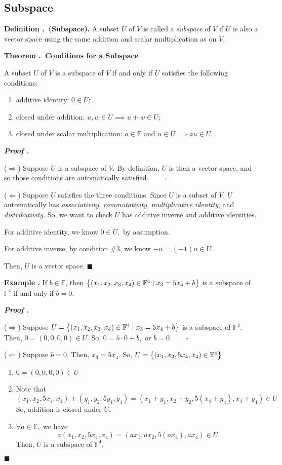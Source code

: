 \documentclass[11pt, letterpaper]{article}
\newcounter{index}[subsection]
\newenvironment*{df}[1]{\par\noindent\textbf{Definition \thesubsection.\stepcounter{index}\theindex\ (#1).}}{\par}
\newenvironment*{eg}{\begin{framed}\par\noindent\textbf{Example \thesubsection.\stepcounter{index}\theindex}}{\par\end{framed}}
\newenvironment*{thm}[1]{\begin{tcolorbox}\par\noindent\textbf{Theorem \thesubsection.\stepcounter{index}\theindex\ #1} \par}{\par\end{tcolorbox}}
\newcounter{nprf}[subsection]
\newenvironment*{prf}{\par\indent\textbf{\textit{Proof \stepcounter{nprf}\thenprf.}}}{\hfill$\blacksquare$\par}
\def\F{\mathbb{F}}
\begin{document}
\subsection{Subspace}
\begin{df}{Subspace}
	A subset $U$ of $V$ is called a \textit{subspace} of $V$ if $U$ is also a vector space using the same addition and scalar multiplication as on $V$.
\end{df}
\begin{thm}{Conditions for a Subspace}
	A subset $U$ of $V$ is a subspace of $V$ if and only if $U$ satisfies the following conditions: 
	\begin{enumerate}
		\item additive identity: $0\in U;$
		\item closed under addition: $u,w\in U\implies u+w\in U;$
		\item closed under scalar multiplication: $a\in \F$ and $u\in U\implies au\in U.$
	\end{enumerate}
\end{thm}
	\begin{prf}
		\par ($\Rightarrow$) Suppose $U$ is a subspace of $V$. By definition, $U$ is then a vector space, and so those conditions are automatically satisfied. $\qquad\square$\par 
		($\Leftarrow$)	Suppose $U$ satisfies the three conditions. Since $U$ is a subset of $V$, $U$ automatically has \textit{associativity}, \textit{commutativity}, \textit{multiplicative identity}, and \textit{distributivity}. So, we want to check $U$ has additive inverse and additive identities. \par For additive identity, we know $0\in U,$ by assumption.\par For additive inverse, by condition \#3, we know $-u=(-1)u\in U.$\par Then, $U$ is a vector space. 
	\end{prf}
\begin{eg}
	If $b\in\F$, then $\qty{(x_1,x_2,x_3,x_4)\in\F^4\mid x_3=5x_4+b}$ is a subspace of $\F^4$ if and only if $b=0$.	
	\begin{prf}
		\par($\Rightarrow$) Suppose $U=\qty{(x_1,x_2,x_3,x_4)\in\F^4\mid x_3=5x_4+b}$ is a subspace of $\F^4.$ Then, $0=(0,0,0,0)\in U.$ So, $0=5\cdot0+b,$ or $b=0.\qquad\square$\par 
		($\Leftarrow$) Suppose $b=0.$ Then, $x_3=5x_4.$ So, $U=\qty{(x_1,x_2,5x_4,x_4)\in\F^4}$
		\begin{enumerate}
			\item $0=(0,0,0,0)\in U$
			\item Note that \[(x_1,x_2,5x_4,x_4)+(y_1,y_2,5y_4,y_4)=(x_1+y_1,x_2+y_2,5(x_4+y_4),x_4+y_4)\in U\] So, addition is closed under $U$.
			\item $\forall a\in\F,$ we have \[a(x_1,x_2,5x_4,x_4)=(ax_1, ax_2, 5(ax_4), ax_4)\in U\] Then, $U$ is a subspace of $\F^4.$
		\end{enumerate}
	\end{prf}
\end{eg}
\end{document}

